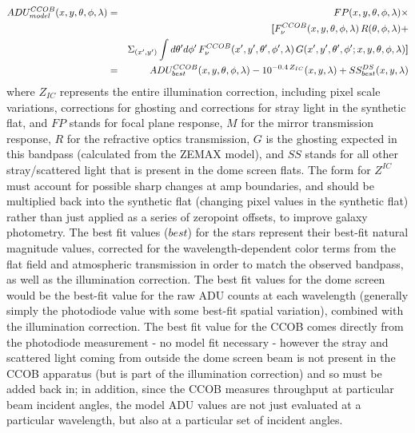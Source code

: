 \documentclass[12pt,preprint]{aastex}
\begin{document}
\begin{eqnarray}
ADU^{CCOB}_{model}(x,y,\theta,\phi,\lambda) & = &  FP(x,y,\theta,\phi,\lambda) \times \nonumber \\
& & {\textbf[}  F_\nu^{CCOB}(x,y,\theta,\phi,\lambda)\,R(\theta,\phi,\lambda) + \nonumber \\
&& \Sigma_{(x',y')} \int d\theta' d\phi' \,F_\nu^{CCOB}(x',y',\theta',\phi',\lambda)\,G(x',y',\theta',\phi';x,y,\theta,\phi,\lambda) {\textbf]} \nonumber \\
& = & ADU^{CCOB}_{best}(x,y,\theta,\phi,\lambda) - 10^{-0.4\,Z_{IC}}(x,y,\lambda) + SS^{DS}_{best}(x,y,\lambda) 
\end{eqnarray} 
where $Z_{IC}$ represents the entire illumination correction,
including pixel scale variations, corrections for ghosting and
corrections for stray light in the synthetic flat, and $FP$ stands for
focal plane response, $M$ for the mirror transmission response, $R$ for the
refractive optics transmission, $G$ is the ghosting expected in this bandpass (calculated from
the ZEMAX model), and $SS$ stands for all other stray/scattered light
that is present in the dome screen flats. The form for
$Z^{IC}$ must account for possible sharp changes at amp boundaries,
and should be multiplied back into the synthetic flat (changing pixel
values in the synthetic flat) rather than just applied as a series of
zeropoint offsets, to improve galaxy photometry. The best fit values ($best$)
for the stars represent their best-fit natural magnitude values, corrected for the wavelength-dependent color
terms from the flat field and atmospheric transmission in order 
to match the observed bandpass, as well as the illumination
correction. The best fit values for the dome screen would be the
best-fit value for the raw ADU counts at each wavelength (generally simply the
photodiode value with some best-fit spatial
variation), combined with the illumination
correction. The best fit value for the CCOB comes directly from the
photodiode measurement - no model fit necessary - however the
stray and scattered light coming from outside the dome screen beam is
not present in the CCOB apparatus (but is part of the illumination
correction) and so must be added back in; in addition,
since the CCOB measures throughput at particular beam incident
angles, the model ADU values are not just evaluated at a particular
wavelength, but also at a particular set of incident angles. 
\end{document}
